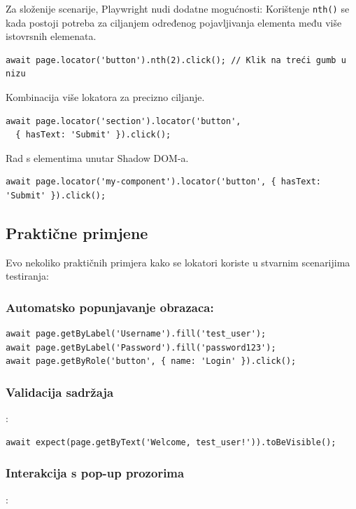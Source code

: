 Za složenije scenarije, Playwright nudi dodatne mogućnosti:
Korištenje \texttt{nth()} se kada postoji potreba za ciljanjem određenog pojavljivanja elementa među više istovrsnih elemenata.

\begin{verbatim}
await page.locator('button').nth(2).click(); // Klik na treći gumb u nizu
\end{verbatim}

Kombinacija više lokatora za precizno ciljanje.
\begin{verbatim}
await page.locator('section').locator('button', 
  { hasText: 'Submit' }).click();
\end{verbatim}

Rad s elementima unutar Shadow DOM-a.
\begin{verbatim}
await page.locator('my-component').locator('button', { hasText: 'Submit' }).click();
\end{verbatim}

\subsection*{Praktične primjene}

Evo nekoliko praktičnih primjera kako se lokatori koriste u stvarnim scenarijima testiranja:

\subsubsection*{Automatsko popunjavanje obrazaca:}

\begin{verbatim}
await page.getByLabel('Username').fill('test_user');
await page.getByLabel('Password').fill('password123');
await page.getByRole('button', { name: 'Login' }).click();
\end{verbatim}

\subsubsection*{Validacija sadržaja}:

\begin{verbatim}
await expect(page.getByText('Welcome, test_user!')).toBeVisible();
\end{verbatim}

\subsubsection*{Interakcija s pop-up prozorima}:

